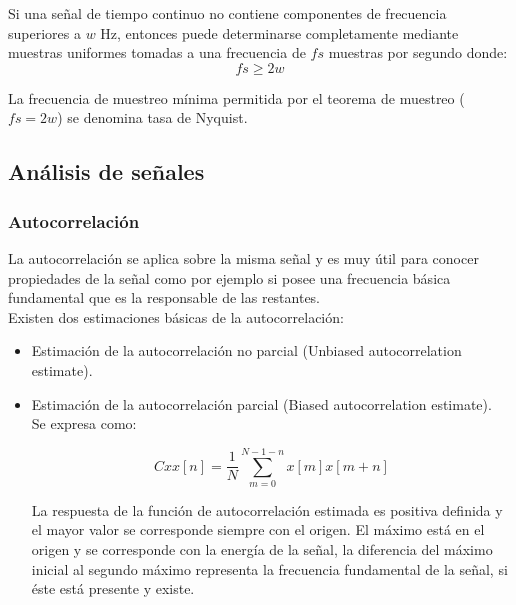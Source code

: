 	Si una señal de tiempo continuo no contiene componentes de frecuencia superiores a $w$ Hz, entonces puede determinarse completamente mediante muestras uniformes tomadas a una frecuencia de $fs$ muestras por segundo donde:
		$$fs \geq 2w$$
	
	La frecuencia de muestreo mínima permitida por el teorema de muestreo ($fs = 2w$) se denomina tasa de Nyquist. \cite{sampling}
	
	\subsection{Análisis de señales}
	
	\subsubsection{Autocorrelación}
	La autocorrelación se aplica sobre la misma señal y es muy útil para conocer propiedades de la señal
	como por ejemplo si posee una frecuencia básica fundamental que es la responsable de las restantes. \\
	
	Existen dos estimaciones básicas de la autocorrelación:
	\begin{itemize}
		\item Estimación de la autocorrelación no parcial (Unbiased autocorrelation estimate).
		\item Estimación de la autocorrelación parcial (Biased autocorrelation estimate). \\
		Se expresa como:
		
		$$Cxx[n] = \frac{1}{N} \sum_{m=0}^{N-1-n}x[m]x[m+n]$$
		
		La respuesta de la función de autocorrelación estimada es positiva definida y el mayor
		valor se corresponde siempre con el origen. El máximo está en el origen y se corresponde con la
		energía de la señal, la diferencia del máximo inicial al segundo máximo representa la frecuencia fundamental de la señal, si éste está presente y existe.
	\end{itemize}

